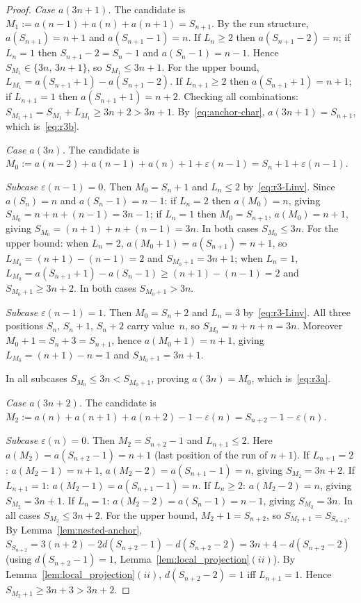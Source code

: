 \documentclass[12pt]{article}
\theoremstyle{definition}
\theoremstyle{remark}
\begin{document}
\begin{proof}
\textit{Case $a(3n+1)$.}
The candidate is $M_1:=a(n-1)+a(n)+a(n+1)=S_{n+1}$.
By the run structure, $a(S_{n+1})=n+1$ and $a(S_{n+1}-1)=n$.
If $L_n\ge 2$ then $a(S_{n+1}-2)=n$; if $L_n=1$ then
$S_{n+1}-2=S_n-1$ and $a(S_n-1)=n-1$.
Hence $S_{M_1}\in\{3n,\,3n+1\}$, so $S_{M_1}\le 3n+1$.
For the upper bound,
$L_{M_1}=a(S_{n+1}+1)-a(S_{n+1}-2)$.
If $L_{n+1}\ge 2$ then $a(S_{n+1}+1)=n+1$;
if $L_{n+1}=1$ then $a(S_{n+1}+1)=n+2$.
Checking all combinations: $S_{M_1+1}=S_{M_1}+L_{M_1}\ge 3n+2>3n+1$.
By~\eqref{eq:anchor-char}, $a(3n+1)=S_{n+1}$,
which is~\eqref{eq:r3b}.

\textit{Case $a(3n)$.}
The candidate is $M_0:=a(n-2)+a(n-1)+a(n)+1+\varepsilon(n-1)=S_n+1+\varepsilon(n-1)$.

\textit{Subcase $\varepsilon(n-1)=0$.}
Then $M_0=S_n+1$ and $L_n\le 2$ by~\eqref{eq:r3-Linv}.
Since $a(S_n)=n$ and $a(S_n-1)=n-1$:
if $L_n=2$ then $a(M_0)=n$, giving
$S_{M_0}=n+n+(n-1)=3n-1$;
if $L_n=1$ then $M_0=S_{n+1}$, $a(M_0)=n+1$, giving
$S_{M_0}=(n+1)+n+(n-1)=3n$.
In both cases $S_{M_0}\le 3n$.
For the upper bound: when $L_n=2$,
$a(M_0+1)=a(S_{n+1})=n+1$, so $L_{M_0}=(n+1)-(n-1)=2$
and $S_{M_0+1}=3n+1$;
when $L_n=1$,
$L_{M_0}=a(S_{n+1}+1)-a(S_n-1)\ge(n+1)-(n-1)=2$
and $S_{M_0+1}\ge 3n+2$.
In both cases $S_{M_0+1}>3n$.

\textit{Subcase $\varepsilon(n-1)=1$.}
Then $M_0=S_n+2$ and $L_n=3$ by~\eqref{eq:r3-Linv}.
All three positions $S_n,\,S_n+1,\,S_n+2$ carry value~$n$, so
$S_{M_0}=n+n+n=3n$.
Moreover $M_0+1=S_n+3=S_{n+1}$, hence $a(M_0+1)=n+1$,
giving $L_{M_0}=(n+1)-n=1$ and $S_{M_0+1}=3n+1$.

In all subcases $S_{M_0}\le 3n<S_{M_0+1}$,
proving $a(3n)=M_0$, which is~\eqref{eq:r3a}.

\textit{Case $a(3n+2)$.}
The candidate is $M_2:=a(n)+a(n+1)+a(n+2)-1-\varepsilon(n)=S_{n+2}-1-\varepsilon(n)$.

\textit{Subcase $\varepsilon(n)=0$.}
Then $M_2=S_{n+2}-1$ and $L_{n+1}\le 2$.
Here $a(M_2)=a(S_{n+2}-1)=n+1$ (last position of the run of $n+1$).
If $L_{n+1}=2$: $a(M_2-1)=n+1$, $a(M_2-2)=a(S_{n+1}-1)=n$,
giving $S_{M_2}=3n+2$.
If $L_{n+1}=1$: $a(M_2-1)=a(S_{n+1}-1)=n$.
\quad If $L_n\ge 2$: $a(M_2-2)=n$, giving $S_{M_2}=3n+1$.
\quad If $L_n=1$: $a(M_2-2)=a(S_n-1)=n-1$, giving $S_{M_2}=3n$.
In all cases $S_{M_2}\le 3n+2$.
For the upper bound, $M_2+1=S_{n+2}$, so
$S_{M_2+1}=S_{S_{n+2}}$.
By Lemma~\ref{lem:nested-anchor},
$S_{S_{n+2}}=3(n+2)-2d(S_{n+2}-1)-d(S_{n+2}-2)=3n+4-d(S_{n+2}-2)$
(using $d(S_{n+2}-1)=1$, Lemma~\ref{lem:local_projection}$(ii)$).
By Lemma~\ref{lem:local_projection}$(ii)$, $d(S_{n+2}-2)=1$
iff $L_{n+1}=1$.
Hence $S_{M_2+1}\ge 3n+3>3n+2$.


\end{proof}
\end{document}
